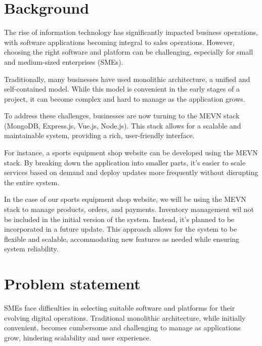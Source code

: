 
\makeatletter
{}
\makeatother



\section{Background}
The rise of information technology has significantly impacted business operations, with software applications becoming integral to sales operations. However, choosing the right software and platform can be challenging, especially for small and medium-sized enterprises (SMEs).

Traditionally, many businesses have used monolithic architecture, a unified and self-contained model. While this model is convenient in the early stages of a project, it can become complex and hard to manage as the application grows.

To address these challenges, businesses are now turning to the MEVN stack (MongoDB, Express.js, Vue.js, Node.js). This stack allows for a scalable and maintainable system, providing a rich, user-friendly interface.

For instance, a sports equipment shop website can be developed using the MEVN stack. By breaking down the application into smaller parts, it's easier to scale services based on demand and deploy updates more frequently without disrupting the entire system.

In the case of our sports equipment shop website, we will be using the MEVN stack to manage products, orders, and payments. Inventory management wil not be included in the initial version of the system. Instead, it's planned to be incorporated in a future update. This approach allows for the system to be flexible and scalable, accommodating new features as needed while ensuring system reliability.
\section{Problem statement}

SMEs face difficulties in selecting suitable software and platforms for their evolving digital operations. Traditional monolithic architecture, while initially convenient, becomes cumbersome and challenging to manage as applications grow, hindering scalability and user experience.


